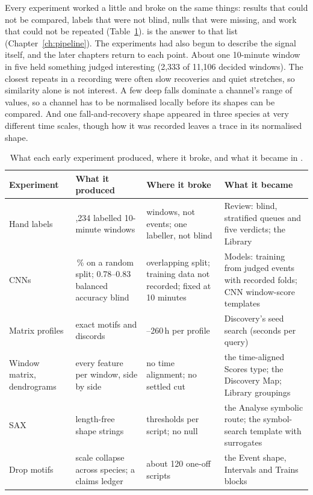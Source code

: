 Every experiment worked a little and broke on the same things: results that could not be compared, labels that were not blind, nulls that were missing, and work that could not be repeated (Table~\ref{tab:lessons}). \tool{} is the answer to that list (Chapter~\ref{ch:pipeline}). The experiments had also begun to describe the signal itself, and the later chapters return to each point. About one 10-minute window in five held something judged interesting (2,333 of 11,106 decided windows). The closest repeats in a recording were often slow recoveries and quiet stretches, so similarity alone is not interest. A few deep falls dominate a channel's range of values, so a channel has to be normalised locally before its shapes can be compared. And one fall-and-recovery shape appeared in three species at very different time scales, though how it was recorded leaves a trace in its normalised shape.

\begin{table}[htbp]
\caption[{What each early experiment produced, where it broke, and what it became.}]{What each early experiment produced, where it broke, and what it became in \tool{}.}
\label{tab:lessons}
\footnotesize
\begin{tabularx}{\textwidth}{p{2.6cm} >{\raggedright\arraybackslash}X >{\raggedright\arraybackslash}X >{\raggedright\arraybackslash}X}
\toprule
\textbf{Experiment} & \textbf{What it produced} & \textbf{Where it broke} & \textbf{What it became}\\
\midrule
Hand labels & 11,234 labelled 10-minute windows & windows, not events; one labeller, not blind & Review: blind, stratified queues and five verdicts; the Library\\
\addlinespace
CNNs & 92\,\% on a random split; 0.78--0.83 balanced accuracy blind & overlapping split; training data not recorded; fixed at 10 minutes & Models: training from judged events with recorded folds; CNN window-score templates\\
\addlinespace
Matrix profiles & exact motifs and discords & 40--260\,h per profile & Discovery's seed search (seconds per query)\\
\addlinespace
Window matrix, dendrograms & every feature per window, side by side & no time alignment; no settled cut & the time-aligned Scores type; the Discovery Map; Library groupings\\
\addlinespace
SAX & length-free shape strings & thresholds per script; no null & the Analyse symbolic route; the symbol-search template with surrogates\\
\addlinespace
Drop motifs & scale collapse across species; a claims ledger & about 120 one-off scripts & the Event shape, Intervals and Trains blocks\\
\bottomrule
\end{tabularx}
\end{table}

